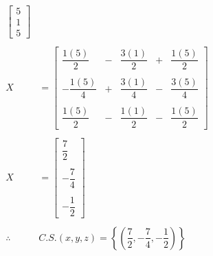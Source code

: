 \documentclass[11pt, a4paper]{article}
\begin{document}
\begin{multicols*}{2}
\begin{align*}
\begin{bmatrix}
      5\\
      1\\
      5
    \end{bmatrix}\\\\
    X &= \begin{bmatrix}
      \dfrac{1\left(5\right)}{2}&-&\dfrac{3\left(1\right)}{2}&+&\dfrac{1\left(5\right)}{2}\\\\
      -\dfrac{1\left(5\right)}{4}&+&\dfrac{3\left(1\right)}{4}&-&\dfrac{3\left(5\right)}{4}\\\\
      \dfrac{1\left(5\right)}{2}&-&\dfrac{1\left(1\right)}{2}&-&\dfrac{1\left(5\right)}{2}
    \end{bmatrix}\\\\
    X &= \begin{bmatrix}
      \dfrac{7}{2}\\\\
      -\dfrac{7}{4}\\\\
      -\dfrac{1}{2}
    \end{bmatrix}\\\\
    \therefore \ &C.S. \left(x,y,z\right) = \left\{\left(\dfrac{7}{2}, -\dfrac{7}{4}, -\dfrac{1}{2}\right)\right\}
  \end{align*}
\end{multicols*}
\newpage
\end{document}
